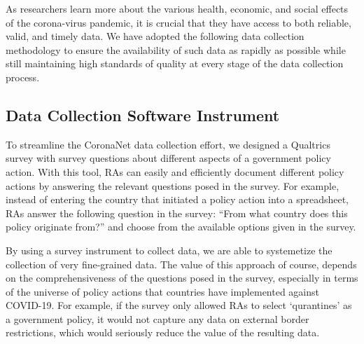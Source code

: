 \documentclass[
]{article}
\begin{document}
As researchers learn more about the various health, economic, and social effects of the corona-virus pandemic, it is crucial that they have access to both reliable, valid, and timely data. We have adopted the following data collection methodology to ensure the availability of such data as rapidly as possible while still maintaining high standards of quality at every stage of the data collection process.

\hypertarget{data-collection-software-instrument}{%
\subsection{Data Collection Software Instrument}\label{data-collection-software-instrument}}

To streamline the CoronaNet data collection effort, we designed a Qualtrics survey with survey questions about different aspects of a government policy action. With this tool, RAs can easily and efficiently document different policy actions by answering the relevant questions posed in the survey. For example, instead of entering the country that initiated a policy action into a spreadsheet, RAs answer the following question in the survey: ``From what country does this policy originate from?'' and choose from the available options given in the survey.

By using a survey instrument to collect data, we are able to systemetize the collection of very fine-grained data. The value of this approach of course, depends on the comprehensiveness of the questions posed in the survey, especially in terms of the universe of policy actions that countries have implemented against COVID-19. For example, if the survey only allowed RAs to select `qurantines' as a government policy, it would not capture any data on external border restrictions, which would seriously reduce the value of the resulting data.
\end{document}
